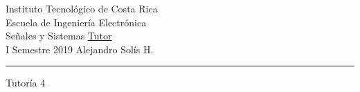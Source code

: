 
\onehalfspace
\noindent
\large Instituto Tecnológico de Costa Rica \\
\large Escuela de Ingeniería Electrónica \\
\large Señales y Sistemas \hfill \underline{Tutor} \\
\large I Semestre 2019 							\hfill Alejandro Solís H.

\noindent\rule[2mm]{\textwidth}{0.4pt}

\begin{center} \LARGE{Tutoría 4} \end{center}

